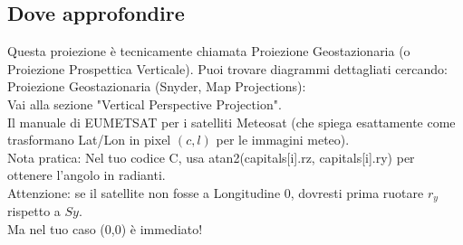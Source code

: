 \documentclass[a4paper,14pt]{article}
\begin{document}
\subsection{Dove approfondire}
Questa proiezione è tecnicamente chiamata Proiezione Geostazionaria (o Proiezione Prospettica Verticale). Puoi trovare diagrammi dettagliati cercando:\\
Proiezione Geostazionaria (Snyder, Map Projections):\\
Vai alla sezione "Vertical Perspective Projection".\\
Il manuale di EUMETSAT per i satelliti Meteosat (che spiega esattamente come trasformano Lat/Lon in pixel \((c,l)\) per le immagini meteo).\\
Nota pratica: Nel tuo codice C, usa atan2(capitals[i].rz, capitals[i].ry) per ottenere l'angolo in radianti.\\
Attenzione: se il satellite non fosse a Longitudine 0, dovresti prima ruotare \(r_{y}\) rispetto a \(Sy\).\\
Ma nel tuo caso (0,0) è immediato!
\end{document}
